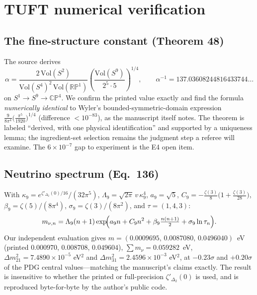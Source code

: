 \documentclass[11pt,letterpaper]{article}
\newcommand{\zetaP}{\zeta'}
\newcommand{\Sp}[1]{S^{#1}}
\begin{document}
\section{TUFT numerical verification}

\subsection{The fine-structure constant (Theorem 48)}
\label{sec:alpha}

The source derives
\begin{equation}
\alpha=\frac{2\,\mathrm{Vol}(\Sp{2})}{\mathrm{Vol}(\Sp{4})^2\,
\mathrm{Vol}(\mathbb{RP}^1)}
\left(\frac{\mathrm{Vol}(\Sp{9})}{2^5\cdot 5}\right)^{1/4},
\qquad \alpha^{-1}=137.03608244816433744\ldots
\end{equation}
on $\Sp{1}\to\Sp{9}\to\mathbb{CP}^4$. We confirm the printed value exactly and
find the formula \emph{numerically identical} to Wyler's
bounded-symmetric-domain expression
$\frac{9}{8\pi^4}\bigl(\frac{\pi^5}{1920}\bigr)^{1/4}$ (difference
$<10^{-83}$), as the manuscript itself notes. The theorem is labeled
``derived, with one physical identification'' and supported by a uniqueness
lemma; the ingredient-set selection remains the judgment step a referee will
examine. The $6\times10^{-7}$ gap to experiment is the E4 open item.

\subsection{Neutrino spectrum (Eq.~136)}
\label{sec:nu}

With $\kappa_9=e^{\zetaP_{\Delta_2}(0)/16}/(32\pi^5)$,
$\Lambda_9=\sqrt{2\pi}\,v\,\kappa_9^4$, $a_9=\sqrt5$,
$C_9=-\frac{\zeta(3)}{8}\bigl(1+\frac{\zeta(3)}{28}\bigr)$,
$\beta_9=\zeta(5)/(8\pi^4)$, $\sigma_9=\zeta(3)/(8\pi^2)$, and
$\tau=(1,4,3)$:
\begin{equation}
m_{\nu,n}=\Lambda_9(n+1)\exp\!\Bigl(a_9 n+C_9 n^2+\beta_9
\tfrac{n(n+1)}{2}+\sigma_9\ln\tau_n\Bigr).
\end{equation}
Our independent evaluation gives
$m=(0.0009695,\,0.0087080,\,0.0496040)$~eV (printed $0.000970$, $0.008708$,
$0.049604$), $\sum m_\nu=0.059282$~eV, $\Delta m^2_{21}=7.4890\times10^{-5}$
eV$^2$ and $\Delta m^2_{31}=2.4596\times10^{-3}$ eV$^2$, at $-0.23\sigma$ and
$+0.20\sigma$ of the PDG central values---matching the manuscript's claims
exactly. The result is insensitive to whether the printed or full-precision
$\zetaP_{\Delta_2}(0)$ is used, and is reproduced byte-for-byte by the
author's public code.
\end{document}
